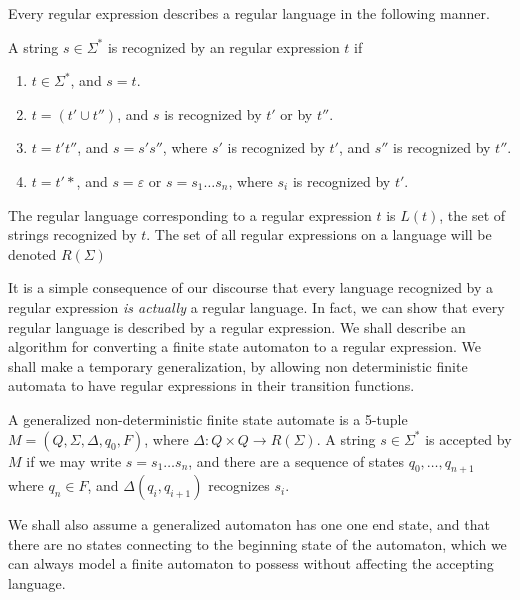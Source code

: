 Every regular expression describes a regular language in the following manner.

\begin{definition}
    A string $s \in \Sigma^*$ is recognized by an regular expression $t$ if
    \begin{enumerate}
        \item $t \in \Sigma^*$, and $s = t$.
        \item $t = (t' \cup t'')$, and $s$ is recognized by $t'$ or by $t''$.
        \item $t = t't''$, and $s = s's''$, where $s'$ is recognized by $t'$, and $s''$ is recognized by $t''$.
        \item $t = t'*$, and $s = \varepsilon$ or $s = s_1 \dots s_n$, where $s_i$ is recognized by $t'$.
    \end{enumerate}
    The regular language corresponding to a regular expression $t$ is $L(t)$, the set of strings recognized by $t$. The set of all regular expressions on a language will be denoted $R(\Sigma)$
\end{definition}

It is a simple consequence of our discourse that every language recognized by a regular expression {\it is actually} a regular language. In fact, we can show that every regular language is described by a regular expression. We shall describe an algorithm for converting a finite state automaton to a regular expression. We shall make a temporary generalization, by allowing non deterministic finite automata to have regular expressions in their transition functions.

\begin{definition}
    A generalized non-deterministic finite state automate is a 5-tuple $M = (Q,\Sigma, \Delta, q_0, F)$, where $\Delta: Q \times Q \to R(\Sigma)$. A string $s \in \Sigma^*$ is accepted by $M$ if we may write $s = s_1 \dots s_n$, and there are a sequence of states $q_0, \dots, q_{n+1}$ where $q_n \in F$, and $\Delta(q_i, q_{i+1})$ recognizes $s_i$.
\end{definition}

We shall also assume a generalized automaton has one one end state, and that there are no states connecting to the beginning state of the automaton, which we can always model a finite automaton to possess without affecting the accepting language.

